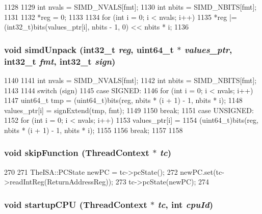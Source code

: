 \begin{DoxyCode}
1128 {
1129     int nvals = SIMD_NVALS[fmt];
1130     int nbits = SIMD_NBITS[fmt];
1131 
1132     *reg = 0;
1133 
1134     for (int i = 0; i < nvals; i++)
1135         *reg |= (int32_t)bits(values_ptr[i], nbits - 1, 0) << nbits * i;
1136 }
\end{DoxyCode}
\hypertarget{namespaceMipsISA_ada59d08ed172da7300eb904edfd82886}{
\subsubsection[{simdUnpack}]{\setlength{\rightskip}{0pt plus 5cm}void simdUnpack (int32\_\-t {\em reg}, \/  uint64\_\-t $\ast$ {\em values\_\-ptr}, \/  int32\_\-t {\em fmt}, \/  int32\_\-t {\em sign})}}
\label{namespaceMipsISA_ada59d08ed172da7300eb904edfd82886}



\begin{DoxyCode}
1140 {
1141     int nvals = SIMD_NVALS[fmt];
1142     int nbits = SIMD_NBITS[fmt];
1143 
1144     switch (sign) {
1145       case SIGNED:
1146         for (int i = 0; i < nvals; i++) {
1147             uint64_t tmp = (uint64_t)bits(reg, nbits * (i + 1) - 1, nbits * i);
1148             values_ptr[i] = signExtend(tmp, fmt);
1149         }
1150         break;
1151       case UNSIGNED:
1152         for (int i = 0; i < nvals; i++) {
1153             values_ptr[i] =
1154                 (uint64_t)bits(reg, nbits * (i + 1) - 1, nbits * i);
1155         }
1156         break;
1157     }
1158 }
\end{DoxyCode}
\hypertarget{namespaceMipsISA_a2624d7d8bac3eb03de2eb6e83903c208}{
\subsubsection[{skipFunction}]{\setlength{\rightskip}{0pt plus 5cm}void skipFunction ({\bf ThreadContext} $\ast$ {\em tc})}}
\label{namespaceMipsISA_a2624d7d8bac3eb03de2eb6e83903c208}



\begin{DoxyCode}
270 {
271     TheISA::PCState newPC = tc->pcState();
272     newPC.set(tc->readIntReg(ReturnAddressReg));
273     tc->pcState(newPC);
274 }
\end{DoxyCode}
\hypertarget{namespaceMipsISA_a343e9193078845bb700799b0c7f24d2a}{
\subsubsection[{startupCPU}]{\setlength{\rightskip}{0pt plus 5cm}void startupCPU ({\bf ThreadContext} $\ast$ {\em tc}, \/  int {\em cpuId})}}
\label{namespaceMipsISA_a343e9193078845bb700799b0c7f24d2a}



